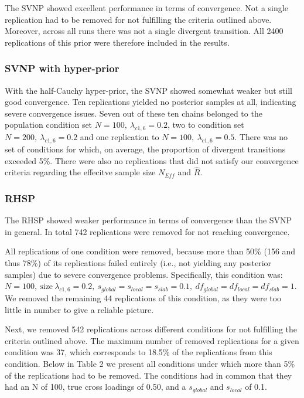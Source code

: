 \documentclass[
  man, donotrepeattitle,floatsintext]{apa6}
\begin{document}
The SVNP showed excellent performance in terms of convergence. Not a
single replication had to be removed for not fulfilling the criteria
outlined above. Moreover, across all runs there was not a single
divergent transition. All 2400 replications of this prior were therefore
included in the results.

\subsubsection{SVNP with hyper-prior}\label{svnp-with-hyper-prior}

With the half-Cauchy hyper-prior, the SVNP showed somewhat weaker but still good convergence. Ten replications yielded no posterior samples at all, indicating severe convergence issues. Seven out of these ten chains belonged to the population condition set \(N = 100, \ \lambda_{c1,6} = 0.2\), two to condition set \(N = 200, \ \lambda_{c1,6} = 0.2\) and one replication to \(N = 100, \ \lambda_{c1,6} = 0.5\). There was no set of conditions for which, on average, the proportion of divergent transitions exceeded 5\%. There were also no replications that did not satisfy our convergence criteria regarding the effecitve sample size \(N_{Eff}\) and \(\hat{R}\).

\subsubsection{RHSP}\label{rhsp}

The RHSP showed weaker performance in terms of convergence than the
SVNP in general. In total 742 replications were removed for not reaching
convergence.

All replications of one condition were removed, because more than 50\%
(156 and thus 78\%) of its replications failed entirely (i.e., not
yielding any posterior samples) due to severe convergence problems.
Specifically, this condition was:
\(N = 100, \ \text{size} \ \lambda_{c1,6} = 0.2, \ s_{global} = s_{local} = s_{slab} = 0.1, \ df_{global} = df_{local} = df_{slab} = 1\).
We removed the remaining 44 replications of this condition, as they were
too little in number to give a reliable picture.

Next, we removed 542 replications across different conditions for not
fulfilling the criteria outlined above. The maximum number of removed
replications for a given condition was 37, which corresponds to 18.5\% of
the replications from this condition. Below in Table 2 we present all
conditions under which more than 5\% of the replications had to be
removed. The conditions had in common that they had an N of 100, true
cross loadings of 0.50, and a \(s_{global}\) and \(s_{local}\) of 0.1.
\end{document}
